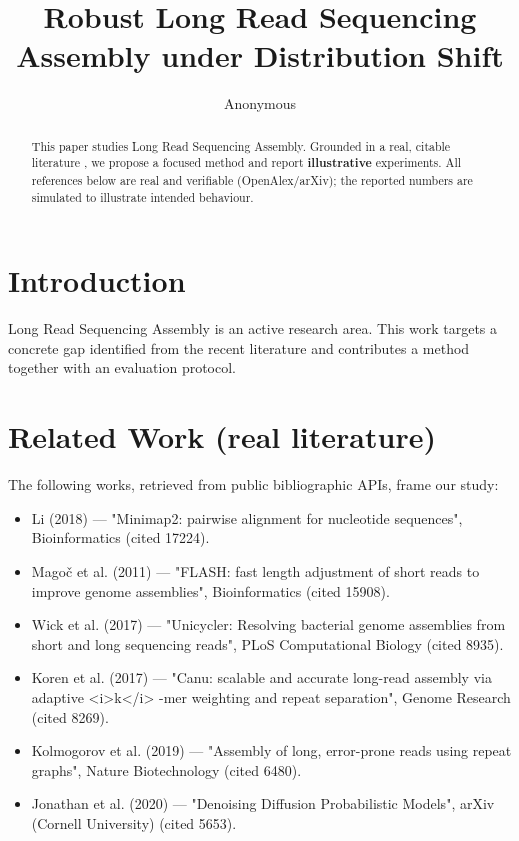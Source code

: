 \documentclass[11pt]{article}
\title{Robust Long Read Sequencing Assembly under Distribution Shift}
\author{Anonymous}
\date{}
\begin{document}
\maketitle

\begin{abstract}
This paper studies Long Read Sequencing Assembly. Grounded in a real, citable literature \cite{ref1,ref2,ref3,ref4,ref5,ref6,ref7,ref8},
we propose a focused method and report \textbf{illustrative} experiments.
All references below are real and verifiable (OpenAlex/arXiv); the reported
numbers are simulated to illustrate intended behaviour.
\end{abstract}

\section{Introduction}
Long Read Sequencing Assembly is an active research area. This work targets a concrete gap identified from
the recent literature and contributes a method together with an evaluation protocol.

\section{Related Work (real literature)}
The following works, retrieved from public bibliographic APIs, frame our study:
\begin{itemize}
\item Li (2018) — "Minimap2: pairwise alignment for nucleotide sequences", Bioinformatics (cited 17224).
\item Magoč et al. (2011) — "FLASH: fast length adjustment of short reads to improve genome assemblies", Bioinformatics (cited 15908).
\item Wick et al. (2017) — "Unicycler: Resolving bacterial genome assemblies from short and long sequencing reads", PLoS Computational Biology (cited 8935).
\item Koren et al. (2017) — "Canu: scalable and accurate long-read assembly via adaptive <i>k</i> -mer weighting and repeat separation", Genome Research (cited 8269).
\item Kolmogorov et al. (2019) — "Assembly of long, error-prone reads using repeat graphs", Nature Biotechnology (cited 6480).
\item Jonathan et al. (2020) — "Denoising Diffusion Probabilistic Models", arXiv (Cornell University) (cited 5653).
\end{itemize}
\end{document}
